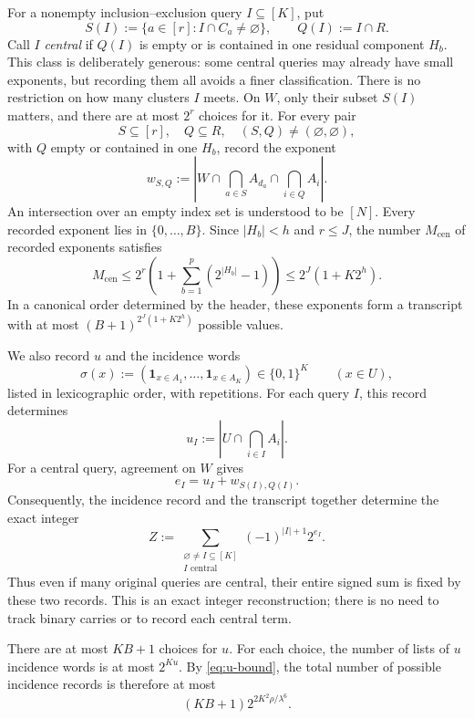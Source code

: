 \documentclass[11pt]{article}
\theoremstyle{definition}
\theoremstyle{remark}
\newcommand{\one}{\mathbf 1}
\newcommand{\bits}{\{0,1\}}
\newcommand{\defterm}[1]{\emph{#1}}
\begin{document}
For a nonempty inclusion--exclusion query $I\subseteq[K]$, put
\[
  S(I):=\{a\in[r]:I\cap C_a\ne\varnothing\},
  \qquad Q(I):=I\cap R.
\]
Call $I$ \defterm{central} if $Q(I)$ is empty or is contained in one
residual component $H_b$. This class is deliberately generous: some central
queries may already have small exponents, but recording them all avoids a
finer classification. There is no restriction on how many clusters $I$
meets. On $W$, only their subset $S(I)$ matters, and there are at most
$2^r$ choices for it. For every pair
\[
  S\subseteq[r],\quad Q\subseteq R,\quad
  (S,Q)\ne(\varnothing,\varnothing),
\]
with $Q$ empty or contained in one $H_b$, record the exponent
\[
  w_{S,Q}:=
  \left|W\cap\bigcap_{a\in S}A_{d_a}\cap\bigcap_{i\in Q}A_i\right|.
\]
An intersection over an empty index set is understood to be $[N]$.
Every recorded exponent lies in $\{0,\ldots,B\}$. Since $|H_b|<h$ and
$r\le J$, the number $M_{\mathrm{cen}}$ of recorded exponents satisfies
\begin{equation}
  M_{\mathrm{cen}}\le2^r\left(1+\sum_{b=1}^p(2^{|H_b|}-1)\right)
    \le2^J(1+K2^h).
  \label{eq:center-query-count}
\end{equation}
In a canonical order determined by the header, these exponents form a
transcript with at most $(B+1)^{2^J(1+K2^h)}$ possible values.

We also record $u$ and the incidence words
\[
  \sigma(x):=(\one_{x\in A_1},\ldots,\one_{x\in A_K})\in\bits^K
  \qquad(x\in U),
\]
listed in lexicographic order, with repetitions. For each query $I$, this
record determines
\[
  u_I:=\left|U\cap\bigcap_{i\in I}A_i\right|.
\]
For a central query, agreement on $W$ gives
\[
  e_I=u_I+w_{S(I),Q(I)}.
\]
Consequently, the incidence record and the transcript together determine
the exact integer
\[
  Z:=\sum_{\substack{\varnothing\ne I\subseteq[K]\\ I\text{ central}}}
          (-1)^{|I|+1}2^{e_I}.
\]
Thus even if many original queries are central, their entire signed sum
is fixed by these two records. This is an exact integer reconstruction;
there is no need to track binary carries or to record each central term.

There are at most $KB+1$ choices for $u$. For each choice, the number of
lists of $u$ incidence words is at most $2^{Ku}$. By
\eqref{eq:u-bound}, the total number of possible incidence records is
therefore at most
\begin{equation}
  (KB+1)2^{2K^2\rho/\lambda^6}.
  \label{eq:exceptional-record-count}
\end{equation}
\end{document}
